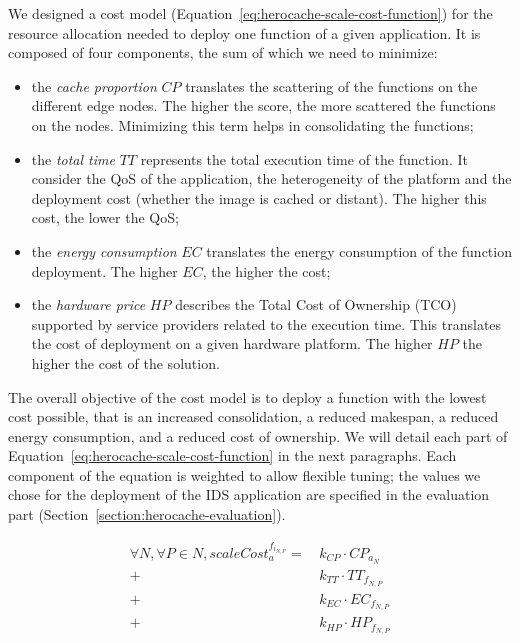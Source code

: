 We designed a cost model (Equation~\ref{eq:herocache-scale-cost-function}) for the resource allocation needed to deploy one function of a given application. It is composed of four components, the sum of which we need to minimize:
\begin{itemize}
    \item the \textit{cache proportion} $CP$ translates the scattering of the functions on the different edge nodes. The higher the score, the more scattered the functions on the nodes. Minimizing this term helps in consolidating the functions;
    \item the \textit{total time} $TT$ represents the total execution time of the function. It consider the QoS of the application, the heterogeneity of the platform and the deployment cost (whether the image is cached or distant). The higher this cost, the lower the QoS;
    \item the \textit{energy consumption} $EC$ translates the energy consumption of the function deployment. The higher $EC$, the higher the cost;
    \item the \textit{hardware price} $HP$ describes the Total Cost of Ownership (TCO) supported by service providers related to the execution time. This translates the cost of deployment on a given hardware platform. The higher $HP$ the higher the cost of the solution.
\end{itemize}

The overall objective of the cost model is to deploy a function with the lowest cost possible, that is an increased consolidation, a reduced makespan, a reduced energy consumption, and a reduced cost of ownership. We will detail each part of Equation~\ref{eq:herocache-scale-cost-function} in the next paragraphs. Each component of the equation is weighted to allow flexible tuning; the values we chose for the deployment of the IDS application are specified in the evaluation part (Section~\ref{section:herocache-evaluation}).

\begin{equation}
\begin{split}
 \forall N, \forall P \in N, scaleCost^{{f}_{{i}_{N, P}}}_{a} = \,   &k_{CP} \cdot {CP}_{{a}_{N}}    \\
    + &k_{TT} \cdot {TT}_{{f}_{N, P}} \\
    + &k_{EC} \cdot {EC}_{{f}_{N, P}} \\
    + &k_{HP} \cdot {HP}_{{f}_{N, P}}
\end{split}
\label{eq:herocache-scale-cost-function}
\end{equation}

